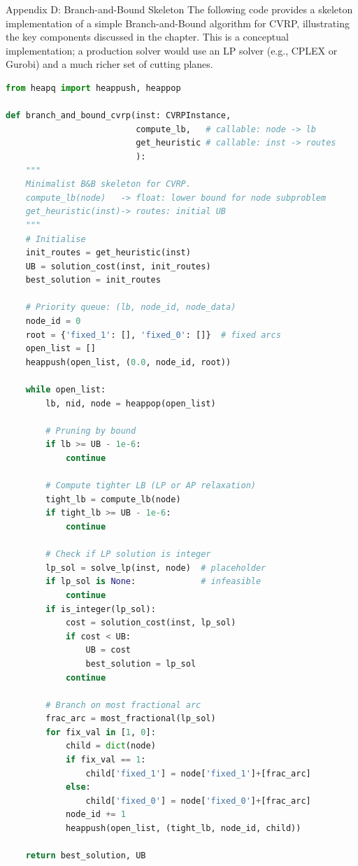 \documentclass[aspectratio=169,10pt]{beamer}
\begin{document}
\begin{frame}[fragile]{Appendix D: Branch-and-Bound Skeleton}
  The following code provides a skeleton implementation of a simple
  Branch-and-Bound algorithm for CVRP, illustrating the key components
  discussed in the chapter. This is a conceptual implementation;
  a production solver would use an LP solver (e.g., CPLEX or Gurobi)
  and a much richer set of cutting planes.

\begin{lstlisting}[language=Python, caption={Branch-and-Bound skeleton for CVRP}]
from heapq import heappush, heappop

def branch_and_bound_cvrp(inst: CVRPInstance,
                          compute_lb,   # callable: node -> lb
                          get_heuristic # callable: inst -> routes
                          ):
    """
    Minimalist B&B skeleton for CVRP.
    compute_lb(node)   -> float: lower bound for node subproblem
    get_heuristic(inst)-> routes: initial UB
    """
    # Initialise
    init_routes = get_heuristic(inst)
    UB = solution_cost(inst, init_routes)
    best_solution = init_routes

    # Priority queue: (lb, node_id, node_data)
    node_id = 0
    root = {'fixed_1': [], 'fixed_0': []}  # fixed arcs
    open_list = []
    heappush(open_list, (0.0, node_id, root))

    while open_list:
        lb, nid, node = heappop(open_list)

        # Pruning by bound
        if lb >= UB - 1e-6:
            continue

        # Compute tighter LB (LP or AP relaxation)
        tight_lb = compute_lb(node)
        if tight_lb >= UB - 1e-6:
            continue

        # Check if LP solution is integer
        lp_sol = solve_lp(inst, node)  # placeholder
        if lp_sol is None:             # infeasible
            continue
        if is_integer(lp_sol):
            cost = solution_cost(inst, lp_sol)
            if cost < UB:
                UB = cost
                best_solution = lp_sol
            continue

        # Branch on most fractional arc
        frac_arc = most_fractional(lp_sol)
        for fix_val in [1, 0]:
            child = dict(node)
            if fix_val == 1:
                child['fixed_1'] = node['fixed_1']+[frac_arc]
            else:
                child['fixed_0'] = node['fixed_0']+[frac_arc]
            node_id += 1
            heappush(open_list, (tight_lb, node_id, child))

    return best_solution, UB
\end{lstlisting}
\end{frame}
\end{document}

